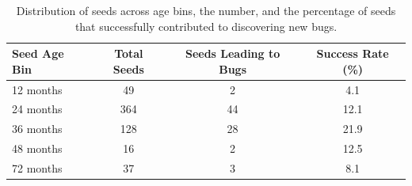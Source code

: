 \begin{table}[t]
    \centering
    \scriptsize
    \caption{Distribution of seeds across age bins, the number, and the percentage of seeds that successfully contributed to discovering new bugs.}
    \begin{tabular}{lccc}
    \toprule
    \textbf{Seed Age Bin} & \textbf{Total Seeds} & \textbf{Seeds Leading to Bugs} & \textbf{Success Rate (\%)} \\
    \midrule
        12 months  & 49  & 2  & 4.1 \\
        24 months  & 364 & 44 & 12.1 \\
        36 months  & 128 & 28 & 21.9 \\
        48 months  & 16  & 2  & 12.5 \\
        72 months  & 37  & 3  & 8.1 \\
    \bottomrule
    \end{tabular}
    \label{tab:seed_success}
\end{table}
